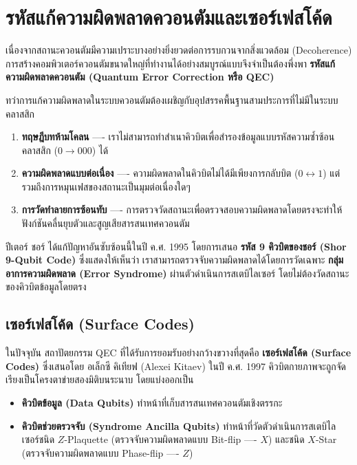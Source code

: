 \section{รหัสแก้ความผิดพลาดควอนตัมและเซอร์เฟสโค้ด}

เนื่องจากสถานะควอนตัมมีความเปราะบางอย่างยิ่งยวดต่อการรบกวนจากสิ่งแวดล้อม (Decoherence) การสร้างคอมพิวเตอร์ควอนตัมขนาดใหญ่ที่ทำงานได้อย่างสมบูรณ์แบบจึงจำเป็นต้องพึ่งพา \textbf{รหัสแก้ความผิดพลาดควอนตัม (Quantum Error Correction หรือ QEC)}

ทว่าการแก้ความผิดพลาดในระบบควอนตัมต้องเผชิญกับอุปสรรคพื้นฐานสามประการที่ไม่มีในระบบคลาสสิก
\begin{enumerate}
    \item \textbf{ทฤษฎีบทห้ามโคลน} ---- เราไม่สามารถทำสำเนาคิวบิตเพื่อสำรองข้อมูลแบบรหัสความซ้ำซ้อนคลาสสิก ($0 \to 000$) ได้
    \item \textbf{ความผิดพลาดแบบต่อเนื่อง} ---- ความผิดพลาดในคิวบิตไม่ได้มีเพียงการกลับบิต ($0 \leftrightarrow 1$) แต่รวมถึงการหมุนเฟสของสถานะเป็นมุมต่อเนื่องใดๆ
    \item \textbf{การวัดทำลายการซ้อนทับ} ---- การตรวจวัดสถานะเพื่อตรวจสอบความผิดพลาดโดยตรงจะทำให้ฟังก์ชันคลื่นยุบตัวและสูญเสียสารสนเทศควอนตัม
\end{enumerate}

ปีเตอร์ ชอร์ ได้แก้ปัญหาอันซับซ้อนนี้ในปี ค.ศ. 1995 โดยการเสนอ \textbf{รหัส 9 คิวบิตของชอร์ (Shor 9-Qubit Code)} ซึ่งแสดงให้เห็นว่า เราสามารถตรวจจับความผิดพลาดได้โดยการวัดเฉพาะ \textbf{กลุ่มอาการความผิดพลาด (Error Syndrome)} ผ่านตัวดำเนินการสเตบิไลเซอร์ โดยไม่ต้องวัดสถานะของคิวบิตข้อมูลโดยตรง

\subsection{เซอร์เฟสโค้ด (Surface Codes)}
ในปัจจุบัน สถาปัตยกรรม QEC ที่ได้รับการยอมรับอย่างกว้างขวางที่สุดคือ \textbf{เซอร์เฟสโค้ด (Surface Codes)} ซึ่งเสนอโดย อเล็กซี คิเทียฟ (Alexei Kitaev) ในปี ค.ศ. 1997 คิวบิตกายภาพจะถูกจัดเรียงเป็นโครงตาข่ายสองมิติบนระนาบ โดยแบ่งออกเป็น
\begin{itemize}
    \item \textbf{คิวบิตข้อมูล (Data Qubits)} ทำหน้าที่เก็บสารสนเทศควอนตัมเชิงตรรกะ
    \item \textbf{คิวบิตช่วยตรวจจับ (Syndrome Ancilla Qubits)} ทำหน้าที่วัดตัวดำเนินการสเตบิไลเซอร์ชนิด $Z$-Plaquette (ตรวจจับความผิดพลาดแบบ Bit-flip ---- $X$) และชนิด $X$-Star (ตรวจจับความผิดพลาดแบบ Phase-flip ---- $Z$)
\end{itemize}

